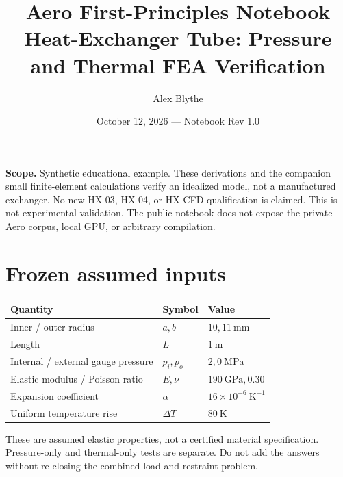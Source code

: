 \documentclass[11pt]{article}
\title{Aero First-Principles Notebook\\Heat-Exchanger Tube: Pressure and Thermal FEA Verification}
\author{Alex Blythe}
\date{October 12, 2026 --- Notebook Rev 1.0}
\begin{document}
\maketitle
\noindent\textbf{Scope.} Synthetic educational example. These derivations and the companion small finite-element calculations verify an idealized model, not a manufactured exchanger. No new HX-03, HX-04, or HX-CFD qualification is claimed. This is not experimental validation. The public notebook does not expose the private Aero corpus, local GPU, or arbitrary compilation.
\section{Frozen assumed inputs}
\begin{center}\begin{tabular}{lll}\toprule
Quantity & Symbol & Value\\\midrule
Inner / outer radius & $a,b$ & $10,11\ \mathrm{mm}$\\
Length & $L$ & $1\ \mathrm{m}$\\
Internal / external gauge pressure & $p_i,p_o$ & $2,0\ \mathrm{MPa}$\\
Elastic modulus / Poisson ratio & $E,\nu$ & $190\ \mathrm{GPa},0.30$\\
Expansion coefficient & $\alpha$ & $16\times10^{-6}\ \mathrm{K^{-1}}$\\
Uniform temperature rise & $\Delta T$ & $80\ \mathrm{K}$\\\bottomrule
\end{tabular}\end{center}
\noindent These are assumed elastic properties, not a certified material specification. Pressure-only and thermal-only tests are separate. Do not add the answers without re-closing the combined load and restraint problem.
\end{document}
